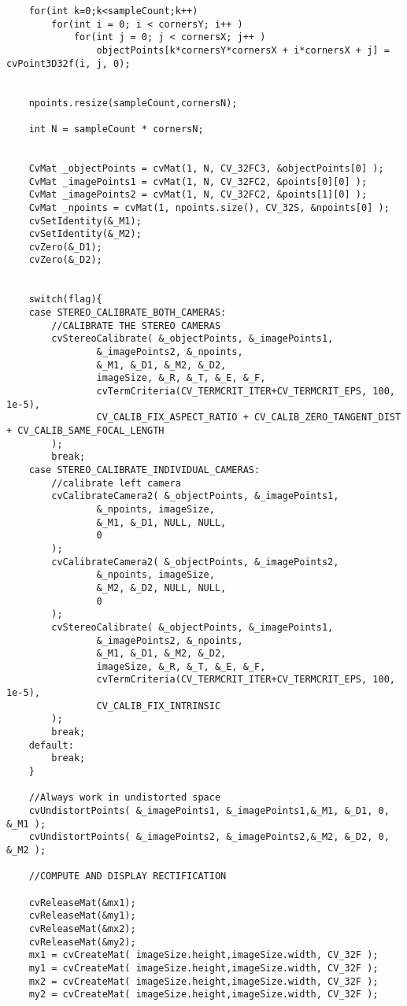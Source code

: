 \begin{lstlisting}
    for(int k=0;k<sampleCount;k++)
        for(int i = 0; i < cornersY; i++ )
            for(int j = 0; j < cornersX; j++ )
                objectPoints[k*cornersY*cornersX + i*cornersX + j] = cvPoint3D32f(i, j, 0);


    npoints.resize(sampleCount,cornersN);

    int N = sampleCount * cornersN;


    CvMat _objectPoints = cvMat(1, N, CV_32FC3, &objectPoints[0] );
    CvMat _imagePoints1 = cvMat(1, N, CV_32FC2, &points[0][0] );
    CvMat _imagePoints2 = cvMat(1, N, CV_32FC2, &points[1][0] );
    CvMat _npoints = cvMat(1, npoints.size(), CV_32S, &npoints[0] );
    cvSetIdentity(&_M1);
    cvSetIdentity(&_M2);
    cvZero(&_D1);
    cvZero(&_D2);


    switch(flag){
    case STEREO_CALIBRATE_BOTH_CAMERAS:
    	//CALIBRATE THE STEREO CAMERAS
    	cvStereoCalibrate( &_objectPoints, &_imagePoints1,
    			&_imagePoints2, &_npoints,
    			&_M1, &_D1, &_M2, &_D2,
    			imageSize, &_R, &_T, &_E, &_F,
    			cvTermCriteria(CV_TERMCRIT_ITER+CV_TERMCRIT_EPS, 100, 1e-5),
    			CV_CALIB_FIX_ASPECT_RATIO + CV_CALIB_ZERO_TANGENT_DIST + CV_CALIB_SAME_FOCAL_LENGTH
    	);
    	break;
    case STEREO_CALIBRATE_INDIVIDUAL_CAMERAS:
    	//calibrate left camera
    	cvCalibrateCamera2( &_objectPoints, &_imagePoints1,
    			&_npoints, imageSize,
    			&_M1, &_D1, NULL, NULL,
    			0
    	);
    	cvCalibrateCamera2( &_objectPoints, &_imagePoints2,
    			&_npoints, imageSize,
    			&_M2, &_D2, NULL, NULL,
    			0
    	);
    	cvStereoCalibrate( &_objectPoints, &_imagePoints1,
    			&_imagePoints2, &_npoints,
    			&_M1, &_D1, &_M2, &_D2,
    			imageSize, &_R, &_T, &_E, &_F,
    			cvTermCriteria(CV_TERMCRIT_ITER+CV_TERMCRIT_EPS, 100, 1e-5),
    			CV_CALIB_FIX_INTRINSIC
    	);
    	break;
    default:
    	break;
    }

    //Always work in undistorted space
    cvUndistortPoints( &_imagePoints1, &_imagePoints1,&_M1, &_D1, 0, &_M1 );
    cvUndistortPoints( &_imagePoints2, &_imagePoints2,&_M2, &_D2, 0, &_M2 );

    //COMPUTE AND DISPLAY RECTIFICATION

	cvReleaseMat(&mx1);
	cvReleaseMat(&my1);
	cvReleaseMat(&mx2);
	cvReleaseMat(&my2);
	mx1 = cvCreateMat( imageSize.height,imageSize.width, CV_32F );
	my1 = cvCreateMat( imageSize.height,imageSize.width, CV_32F );
	mx2 = cvCreateMat( imageSize.height,imageSize.width, CV_32F );
	my2 = cvCreateMat( imageSize.height,imageSize.width, CV_32F );


\end{lstlisting}
